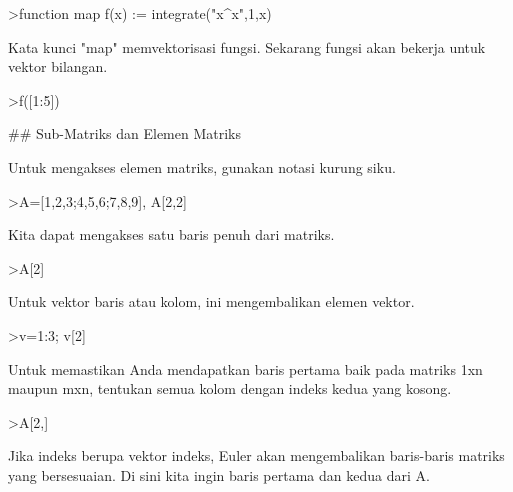\documentclass[a4paper,10pt]{article}
\begin{document}
\begin{eulernotebook}
\begin{euleroutput}
\end{euleroutput}
\begin{eulerprompt}
>function map f(x) := integrate("x^x",1,x)
\end{eulerprompt}
\begin{euleroutput}
  
  Kata kunci "map" memvektorisasi fungsi. Sekarang fungsi akan bekerja untuk vektor bilangan.
  
\end{euleroutput}
\begin{eulerprompt}
>f([1:5])
\end{eulerprompt}
\begin{euleroutput}
  
  ## Sub-Matriks dan Elemen Matriks
  
  Untuk mengakses elemen matriks, gunakan notasi kurung siku.
  
\end{euleroutput}
\begin{eulerprompt}
>A=[1,2,3;4,5,6;7,8,9], A[2,2]
\end{eulerprompt}
\begin{euleroutput}
  
  Kita dapat mengakses satu baris penuh dari matriks.
  
\end{euleroutput}
\begin{eulerprompt}
>A[2]
\end{eulerprompt}
\begin{euleroutput}
  
  Untuk vektor baris atau kolom, ini mengembalikan elemen vektor.
  
\end{euleroutput}
\begin{eulerprompt}
>v=1:3; v[2]
\end{eulerprompt}
\begin{euleroutput}
  
  Untuk memastikan Anda mendapatkan baris pertama baik pada matriks 1xn maupun mxn, tentukan semua kolom dengan indeks kedua yang kosong.
  
\end{euleroutput}
\begin{eulerprompt}
>A[2,]
\end{eulerprompt}
\begin{euleroutput}
  
  Jika indeks berupa vektor indeks, Euler akan mengembalikan baris-baris matriks yang bersesuaian. Di sini kita ingin baris pertama dan kedua dari A.
  

\end{euleroutput}
\end{eulernotebook}
\end{document}
